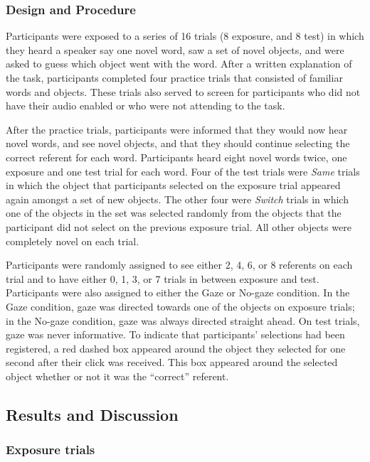 \documentclass[a4paper,man,natbib]{apa6}
\begin{document}
\subsubsection{Design and Procedure}\label{design-and-procedure}

Participants were exposed to a series of 16 trials (8 exposure, and 8
test) in which they heard a speaker say one novel word, saw a set of
novel objects, and were asked to guess which object went with the word.
After a written explanation of the task, participants completed four
practice trials that consisted of familiar words and objects. These
trials also served to screen for participants who did not have their
audio enabled or who were not attending to the task.

After the practice trials, participants were informed that they would
now hear novel words, and see novel objects, and that they should
continue selecting the correct referent for each word. Participants
heard eight novel words twice, one exposure and one test trial for each
word. Four of the test trials were \emph{Same} trials in which the
object that participants selected on the exposure trial appeared again
amongst a set of new objects. The other four were \emph{Switch} trials
in which one of the objects in the set was selected randomly from the
objects that the participant did not select on the previous exposure
trial. All other objects were completely novel on each trial.

Participants were randomly assigned to see either 2, 4, 6, or 8
referents on each trial and to have either 0, 1, 3, or 7 trials in
between exposure and test. Participants were also assigned to either the
Gaze or No-gaze condition. In the Gaze condition, gaze was directed
towards one of the objects on exposure trials; in the No-gaze condition,
gaze was always directed straight ahead. On test trials, gaze was never
informative. To indicate that participants' selections had been
registered, a red dashed box appeared around the object they selected
for one second after their click was received. This box appeared around
the selected object whether or not it was the ``correct'' referent.

\subsection{Results and Discussion}\label{results-and-discussion}

\subsubsection{Exposure trials}\label{exposure-trials}
\end{document}
